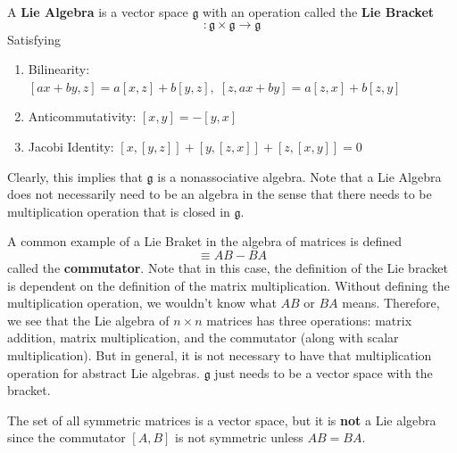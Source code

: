 \documentclass{article}
\begin{document}
    \begin{definition}
      A \textbf{Lie Algebra} is a vector space $\mathfrak{g}$ with an operation called the \textbf{Lie Bracket} 
      \begin{equation}
        [\cdot, \cdot]: \mathfrak{g} \times \mathfrak{g} \longrightarrow \mathfrak{g}
      \end{equation}
      Satisfying
      \begin{enumerate}
        \item Bilinearity: $[ax + by, z] = a[x,z] + b[y,z], \; [z, ax + by] = a[z, x] + b[z,y]$
        \item Anticommutativity: $[x,y] = -[y,x]$
        \item Jacobi Identity: $[x,[y,z]] + [y,[z,x]] + [z,[x,y]] = 0$
      \end{enumerate}
      Clearly, this implies that $\mathfrak{g}$ is a nonassociative algebra. Note that a Lie Algebra does not necessarily need to be an algebra in the sense that there needs to be multiplication operation that is closed in $\mathfrak{g}$. 
    \end{definition}

    \begin{example}
      A common example of a Lie Braket in the algebra of matrices is defined
      \begin{equation}
        [A, B] \equiv AB - BA
      \end{equation}
      called the \textbf{commutator}. Note that in this case, the definition of the Lie bracket is dependent on the definition of the matrix multiplication. Without defining the multiplication operation, we wouldn't know what $AB$ or $BA$ means. Therefore, we see that the Lie algebra of $n \times n$ matrices has three operations: matrix addition, matrix multiplication, and the commutator (along with scalar multiplication). But in general, it is not necessary to have that multiplication operation for abstract Lie algebras. $\mathfrak{g}$ just needs to be a vector space with the bracket.  
    \end{example}

    \begin{example}
      The set of all symmetric matrices is a vector space, but it is \textbf{not} a Lie algebra since the commutator $[A,B]$ is not symmetric unless $A B = B A$. 
    \end{example}
\end{document}
